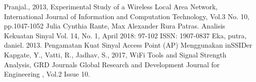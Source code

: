 \documentclass[conference]{IEEEtran}
\begin{document}
\begin{thebibliography}{00}
     Pranjal., 2013, Experimental Study of a Wireless Local Area Network, International Journal of Information and Computation Technology, Vol.3 No. 10, pp.1047-1052
     Julia Cynthia Rante, Max Alexander Rura Patras. Analisis Kekuatan Sinyal Vol. 14, No. 1, April 2018: 97-102 ISSN: 1907-0837
     Eka, putra, daniel. 2013. Pengamatan Kuat Sinyal Access Point (AP) Menggunakan inSSIDer
     Kapgate, Y., Vatti, R., Jadhav, S., 2017, WiFi Tools and Signal Strength Analysis, GRD Journals Global Research and Development Journal for Engineering , Vol.2 Issue 10.
\end{thebibliography}
\end{document}
